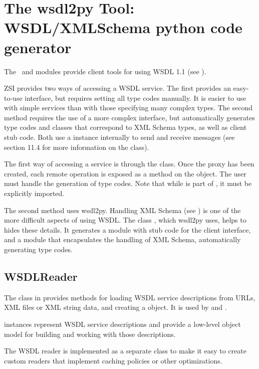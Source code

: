 \chapter{The wsdl2py Tool: WSDL/XMLSchema python code generator}

The \ZSI~and  modules provide client tools for
using WSDL 1.1
(see ).

ZSI provides two ways of accessing a WSDL service.  The first
provides an easy-to-use interface,
but requires setting all type codes manually.  It is easier
to use with simple services than with those specifying many
complex types.
The second method requires the use of a more complex
interface, but automatically generates type codes and classes
that correspond to XML Schema types, as well as client stub code.
Both use a  instance internally to send and receive
messages (see section 11.4 for more information on the 
class).

The first way of accessing a service is through the  class.
Once the proxy has been created, each remote operation is exposed
as a method on the object.
The user must handle the generation of type codes.
Note that while  is part of \ZSI{}, it must be
explicitly imported.

The second method uses wsdl2py.  Handling XML Schema
(see ) 
is one of the more difficult aspects
of using WSDL.  The class , which wsdl2py
uses, helps to hides these
details.  It generates a module with stub code for the client interface,
and a module that encapsulates the handling of XML Schema, automatically
generating type codes.

\section{WSDLReader}

The  class in  provides
methods for loading WSDL service descriptions from URLs, XML files
or XML string data, and creating a  object.
It is used by  and .

 instances represent WSDL service descriptions and provide 
a low-level object model for building and working with those descriptions.

The WSDL reader is implemented as a 
separate class to make it easy to create custom readers that implement 
caching policies or other optimizations.


